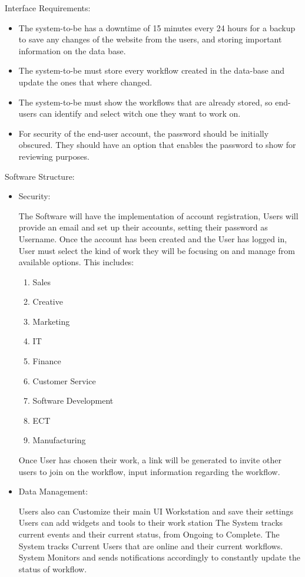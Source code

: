 \documentclass{article}
\begin{document}
\vspace{30}
Interface Requirements:
\begin{itemize}
    \item The system-to-be has a downtime of 15 minutes every 24 hours for a backup to save any changes of the website from the users, and storing important information on the data base.
    \item The system-to-be must store every workflow created in the data-base and update the ones that where changed.
    \item The system-to-be must show the workflows that are already stored, so end-users can identify and select witch one they want to work on.
    \item For security of the end-user account, the password should be initially obscured. They should have an option that enables the password to show for reviewing purposes.
\end{itemize}
\vspace{80}
Software Structure:

\begin{itemize}
    \item Security:

\vspace{5}
The Software will have the implementation of account registration, Users will provide an email and set up their accounts,
setting their password as Username. Once the account has been created and the User has logged in, User must select the
kind of work they will be focusing on and manage from available options. This includes:
\begin{enumerate}
    \item Sales
    \item Creative
    \item Marketing
    \item IT
    \item Finance
    \item Customer Service
    \item Software Development
    \item ECT
    \item Manufacturing
\end{enumerate}
Once
User has chosen their work, a link will be generated to invite other users to join on the workflow, input information
regarding the workflow.\\
\end{itemize}

\begin{itemize}
    \item Data Management:

    \vspace{5}
    Users also can Customize their main UI Workstation and save their settings
    Users can add widgets and tools to their
    work station
    The System tracks current events and their current status, from Ongoing to Complete.
    The System tracks Current Users that are online and their current workflows.
    System Monitors and sends notifications accordingly to constantly update the status of workflow.
\end{itemize}
\end{document}
